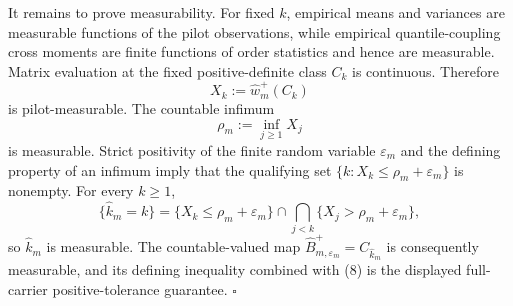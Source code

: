 It remains to prove measurability.  For fixed \(k\), empirical means and variances are measurable functions of the pilot observations, while empirical quantile-coupling cross moments are finite functions of order statistics and hence are measurable.  Matrix evaluation at the fixed positive-definite class \(C_k\) is continuous.  Therefore
\[
 X_k:=\widehat w_m^+(C_k)
\]
is pilot-measurable.  The countable infimum
\[
 \rho_m:=\inf_{j\ge1}X_j
\]
is measurable.  Strict positivity of the finite random variable \(\varepsilon_m\) and the defining property of an infimum imply that the qualifying set
\(\{k:X_k\le\rho_m+\varepsilon_m\}\) is nonempty.  For every \(k\ge1\),
\[
 \{\widehat k_m=k\}
 =\{X_k\le\rho_m+\varepsilon_m\}
  \cap\bigcap_{j<k}\{X_j>\rho_m+\varepsilon_m\},
\tag{9}
\]
so \(\widehat k_m\) is measurable.  The countable-valued map
\(\widehat B_{m,\varepsilon_m}^+=C_{\widehat k_m}\) is consequently measurable, and its defining inequality combined with (8) is the displayed full-carrier positive-tolerance guarantee. \(\square\)